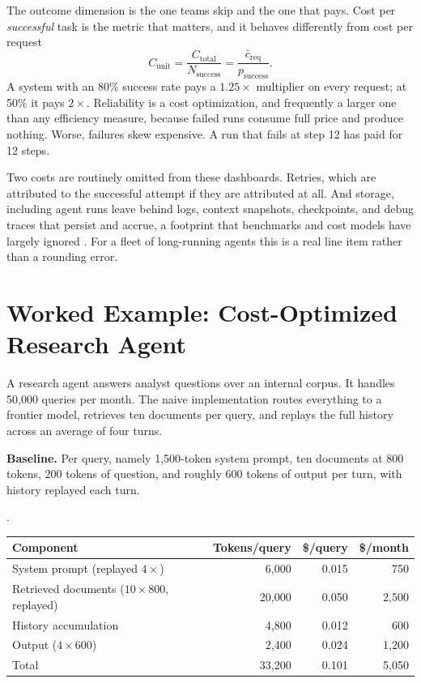 The outcome dimension is the one teams skip and the one that pays. Cost per
\emph{successful} task is the metric that matters, and it behaves differently
from cost per request
\[
C_{\text{unit}} = \frac{C_{\text{total}}}{N_{\text{success}}}
= \frac{\bar{c}_{\text{req}}}{p_{\text{success}}}.
\]
A system with an 80\% success rate pays a $1.25\times$ multiplier on every
request; at 50\% it pays $2\times$. Reliability is a cost optimization, and
frequently a larger one than any efficiency measure, because failed runs consume
full price and produce nothing. Worse, failures skew expensive. A run that
fails at step 12 has paid for 12 steps.

Two costs are routinely omitted from these dashboards. Retries, which are
attributed to the successful attempt if they are attributed at all. And storage, including agent runs leave behind logs, context snapshots, checkpoints, and debug traces
that persist and accrue, a footprint that benchmarks and cost models have largely
ignored \cite{footprint2026}. For a fleet of long-running agents this is a real
line item rather than a rounding error.

\section{Worked Example: Cost-Optimized Research Agent}

A research agent answers analyst questions over an internal corpus. It handles
50{,}000 queries per month. The naive implementation routes everything to a
frontier model, retrieves ten documents per query, and replays the full history
across an average of four turns.

\textbf{Baseline.} Per query, namely 1{,}500-token system prompt, ten documents at 800
tokens, 200 tokens of question, and roughly 600 tokens of output per turn, with
history replayed each turn.

\begin{center}.
\begin{tabular}{lrrr}
\toprule
Component & Tokens/query & \$/query & \$/month \\
\midrule
System prompt (replayed $4\times$) & 6{,}000 & 0.015 & 750 \\
Retrieved documents ($10\times800$, replayed) & 20{,}000 & 0.050 & 2{,}500 \\
History accumulation & 4{,}800 & 0.012 & 600 \\
Output ($4 \times 600$) & 2{,}400 & 0.024 & 1{,}200 \\
\midrule
Total & 33{,}200 & 0.101 & 5{,}050 \\
\bottomrule
\end{tabular}
\end{center}

